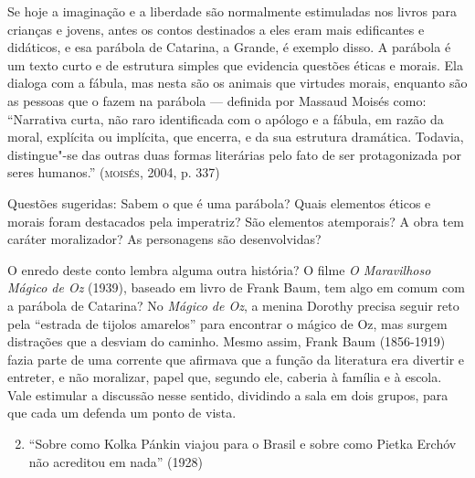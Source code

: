 \documentclass[11pt]{extarticle}
\begin{document}
Se hoje a imaginação e a liberdade são normalmente estimuladas nos
livros para crianças e jovens, antes os contos destinados a eles eram
mais edificantes e didáticos, e esa parábola de Catarina, a Grande, é
exemplo disso. A parábola é um texto curto e de estrutura simples que
evidencia questões éticas e morais. Ela dialoga com a fábula, mas nesta
são os animais que virtudes morais, enquanto são as pessoas que o fazem
na parábola --- definida por Massaud Moisés como: ``Narrativa curta, não
raro identificada com o apólogo e a fábula, em razão da moral, explícita
ou implícita, que encerra, e da sua estrutura dramática. Todavia,
distingue"-se das outras duas formas literárias pelo fato de ser
protagonizada por seres humanos.'' (\textsc{moisés}, 2004, p. 337)

Questões sugeridas: Sabem o que é uma parábola? Quais elementos éticos e
morais foram destacados pela imperatriz? São elementos atemporais? A
obra tem caráter moralizador? As personagens são desenvolvidas?

\begin{figure}[ht!]
\end{figure}


O enredo deste conto lembra alguma outra história? O filme \emph{O
Maravilhoso Mágico de Oz} (1939), baseado em livro de Frank Baum, tem
algo em comum com a parábola de Catarina? No \emph{Mágico de Oz}, a
menina Dorothy precisa seguir reto pela ``estrada de tijolos amarelos''
para encontrar o mágico de Oz, mas surgem distrações que a desviam do
caminho. Mesmo assim, Frank Baum (1856-1919) fazia parte de uma corrente
que afirmava que a função da literatura era divertir e entreter, e não
moralizar, papel que, segundo ele, caberia à família e à escola. Vale
estimular a discussão nesse sentido, dividindo a sala em dois grupos,
para que cada um defenda um ponto de vista.

\begin{enumerate}
\setcounter{enumi}{1}
\item ``Sobre como Kolka Pánkin viajou para o Brasil e sobre como
Pietka Erchóv não acreditou em nada'' (1928)
\end{enumerate}
\end{document}
